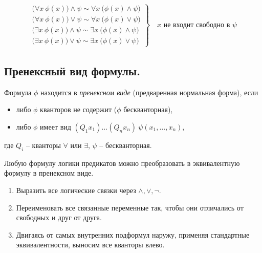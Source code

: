 \begin{theorem}
\[    \]
    \[
        \begin{array}{l}
            \left.\begin{array}{l}
                      \big(\forall x \ \phi(x)\big)\land\psi \sim \forall x \ \big(\phi(x)\land \psi\big) \\
                      \big(\forall x \ \phi(x)\big)\lor\psi \sim \forall x \ \big(\phi(x)\lor \psi\big)   \\
                      \big(\exists x \ \phi(x)\big)\land\psi \sim \exists x \ \big(\phi(x)\land \psi\big) \\
                      \big(\exists x \ \phi(x)\big)\lor\psi \sim \exists x \ \big(\phi(x)\lor \psi\big)
                  \end{array}\right\} \quad x \text{ не входит свободно в }\psi
        \end{array}
    \]
\end{theorem}

\subsection{Пренексный вид формулы.}

\begin{definition}
    Формула $ \phi $ находится в \emph{пренексном виде} (предваренная нормальная форма), если
    \begin{itemize}
        \item либо $ \phi $ кванторов не содержит ($ \phi $ бескванторная), \\
        \item либо $ \phi $ имеет вид $ (Q_1x_1)\ldots(Q_nx_n) \ \psi(x_1,\ldots,x_n) $,
    \end{itemize}
    где $ Q_i $ -- кванторы $ \forall $ или $ \exists $, $ \psi $ -- бескванторная.
\end{definition}

\begin{theorem}
    Любую формулу логики предикатов можно преобразовать в эквивалентную формулу в пренексном виде.
\end{theorem}

\begin{note}\leavevmode
    \begin{enumerate}
        \item Выразить все логические связки через $ \land,\lor,\lnot $.
        \item Переименовать все связанные переменные так, чтобы они отличались от свободных и друг от друга.
        \item Двигаясь от самых внутренних подформул наружу, применяя стандартные эквивалентности, выносим все кванторы влево.
    \end{enumerate}
\end{note}

